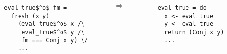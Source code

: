 \begin{columns}[T]
  \centering
  
  \begin{column}{0.35\textwidth}
    \begin{lstlisting} 
  eval_true$^o$ fm = 
    fresh (x y) 
      (eval_true$^o$ x /\
       eval_true$^o$ y /\ 
       fm === Conj x y) \/
      ... 
    \end{lstlisting}
  \end{column}

  \begin{column}{0.1\textwidth}
    \begin{center}
      $\Rightarrow$
    \end{center}
  \end{column}

  \begin{column}{0.35\textwidth}
    \begin{lstlisting}
  eval_true = do 
    x <- eval_true
    y <- eval_true 
    return (Conj x y) 
    ... 
    \end{lstlisting}
  \end{column}
\end{columns}